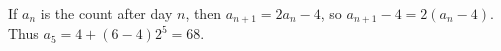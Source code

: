 If $a_n$ is the count after day $n$, then $a_{n+1}=2a_n-4$, so $a_{n+1}-4=2(a_n-4)$. Thus $a_5=4+(6-4)2^5=\boxed{68}$.
